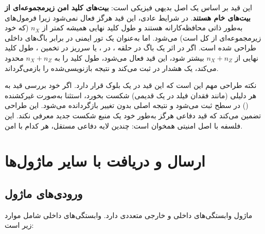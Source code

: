 این قید بر اساس یک اصل بدیهی فیزیکی است: \textbf{بیت‌های کلید امن زیرمجموعه‌ای از بیت‌های خام  هستند}. در شرایط عادی، این قید هرگز فعال نمی‌شود زیرا فرمول‌های  به‌طور ذاتی محافظه‌کارانه هستند و طول کلید نهایی همیشه کمتر از $n_X$ (که خود زیرمجموعه‌ای از کل  است) می‌شود. اما به‌عنوان یک تور ایمنی در برابر باگ‌های داخلی طراحی شده است. اگر در اثر یک باگ در حلقه ،  در ، یا سرریز در تخمین ، طول کلید نهایی از $n_X + n_Z$ بیشتر شود، این قید فعال می‌شود، طول کلید را به $n_X + n_Z$ محدود می‌کند، یک هشدار در  ثبت می‌کند و نتیجه بازنویسی‌شده را بازمی‌گرداند.

نکته طراحی مهم این است که این قید در یک بلوک  قرار دارد. اگر خود بررسی قید به هر دلیلی (مانند فقدان فیلد  در یک  قدیمی) شکست بخورد، استثنا به‌صورت غیرکشنده () در سطح  ثبت می‌شود و نتیجه اصلی بدون تغییر بازگردانده می‌شود. این طراحی تضمین می‌کند که قید دفاعی هرگز به‌طور خود یک منبع شکست جدید معرفی نکند. این فلسفه  با اصل امنیتی  همخوان است: چندین لایه دفاعی مستقل، هر کدام با  امن.

\section{ارسال و دریافت با سایر ماژول‌ها}

\subsection{ورودی‌های ماژول}

ماژول  وابستگی‌های داخلی و خارجی متعددی دارد. وابستگی‌های داخلی شامل موارد زیر است:

